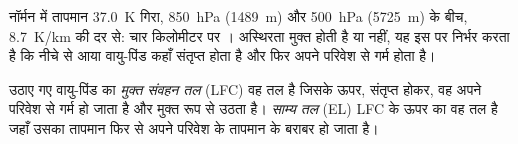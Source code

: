नॉर्मन में तापमान \qty{37.0}{K} गिरा, \qty{850}{hPa} (\qty{1489}{m}) और
\qty{500}{hPa} (\qty{5725}{m}) के बीच, \qty{8.7}{K/km} की दर से: चार किलोमीटर पर ।
अस्थिरता मुक्त होती है या नहीं, यह इस पर निर्भर करता है कि नीचे से आया वायु-पिंड कहाँ संतृप्त होता है और
फिर अपने परिवेश से गर्म होता है।

\begin{definition}[मुक्त संवहन तल; साम्य तल]\label{def:b2:atmospheric-thermodynamics:parcel-levels}
उठाए गए वायु-पिंड का \emph{मुक्त संवहन तल} (LFC) वह
तल है जिसके ऊपर, संतृप्त होकर, वह अपने परिवेश से गर्म हो जाता है और मुक्त रूप से उठता है।
\emph{साम्य तल} (EL) LFC के ऊपर का वह तल है जहाँ उसका
तापमान फिर से अपने परिवेश के तापमान के बराबर हो जाता है।
\end{definition}

